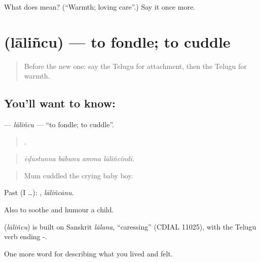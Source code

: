\begin{tcolorbox}[breakable,colback=teal!4,colframe=teal!35!black,title={Before you move on}]
What does  mean? (\textquotedblleft{}Warmth; loving care\textquotedblright{}.) Say it once more.
\end{tcolorbox}
\section[\texorpdfstring{\te{లాలించు} (lāliñcu)}{లాలించు (lāliñcu)}]{ (lāliñcu) — to fondle; to cuddle}

\label{lesson:TE-C503-lalincu}



\begin{quote}
Before the new one: say the Telugu for attachment, then the Telugu for warmth.
\end{quote}

\subsection*{You'll want to know: }
\textbf{} — \emph{lāliñcu} — \textquotedblleft{}to fondle; to cuddle\textquotedblright{}.

\begin{quote}
   .
\end{quote}

\begin{quote}
\emph{ēḍustunna bābunu amma lāliñcindi.}
\end{quote}

\begin{quote}
Mum cuddled the crying baby boy.
\end{quote}

Past (I …): , \emph{lāliñcānu}.

Also to soothe and humour a child.

\begin{cousinweb}
\textbf{} (\emph{lāliñcu}) is built on Sanskrit \emph{lālana}, \textquotedblleft{}caressing\textquotedblright{} (CDIAL 11025), with the Telugu verb ending -.
\end{cousinweb}

\begin{grammarlens}[title={What you've built}]
One more word for describing what you lived and felt.
\end{grammarlens}

